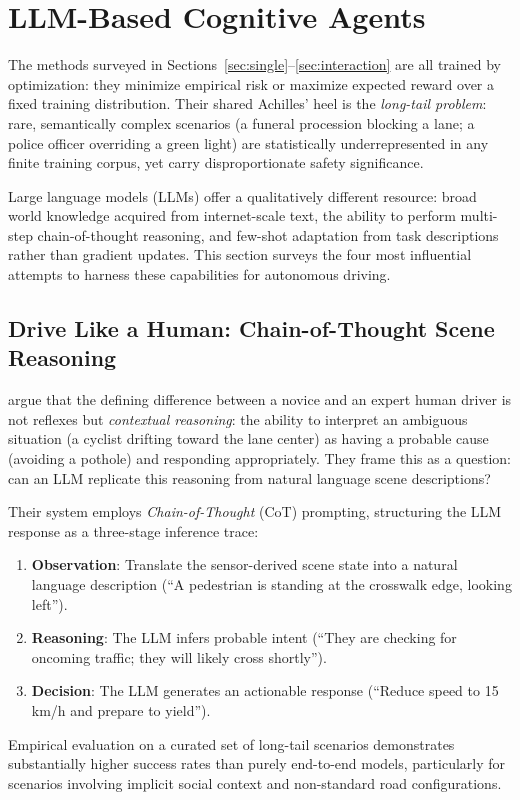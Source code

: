 \documentclass[12pt, a4paper]{article}
\begin{document}
\section{LLM-Based Cognitive Agents}
\label{sec:cognitive}

The methods surveyed in Sections~\ref{sec:single}--\ref{sec:interaction} are all
trained by optimization: they minimize empirical risk or maximize expected reward
over a fixed training distribution. Their shared Achilles' heel is the
\emph{long-tail problem}: rare, semantically complex scenarios (a funeral
procession blocking a lane; a police officer overriding a green light) are
statistically underrepresented in any finite training corpus, yet carry
disproportionate safety significance.

Large language models (LLMs) offer a qualitatively different resource: broad world
knowledge acquired from internet-scale text, the ability to perform multi-step
chain-of-thought reasoning, and few-shot adaptation from task descriptions rather
than gradient updates. This section surveys the four most influential attempts to
harness these capabilities for autonomous driving.

\subsection{Drive Like a Human: Chain-of-Thought Scene Reasoning}
\label{sec:dlh}

\citet{fu2023drive} argue that the defining difference between a novice and an
expert human driver is not reflexes but \emph{contextual reasoning}: the ability
to interpret an ambiguous situation (a cyclist drifting toward the lane center)
as having a probable cause (avoiding a pothole) and responding appropriately.
They frame this as a question: can an LLM replicate this reasoning from natural
language scene descriptions?

Their system employs \emph{Chain-of-Thought} (CoT) prompting, structuring the LLM
response as a three-stage inference trace:
\begin{enumerate}[noitemsep]
  \item \textbf{Observation}: Translate the sensor-derived scene state into a
        natural language description (``A pedestrian is standing at the crosswalk
        edge, looking left'').
  \item \textbf{Reasoning}: The LLM infers probable intent
        (``They are checking for oncoming traffic; they will likely cross shortly'').
  \item \textbf{Decision}: The LLM generates an actionable response
        (``Reduce speed to 15\,km/h and prepare to yield'').
\end{enumerate}
Empirical evaluation on a curated set of long-tail scenarios demonstrates
substantially higher success rates than purely end-to-end models, particularly for
scenarios involving implicit social context and non-standard road configurations.
\end{document}
